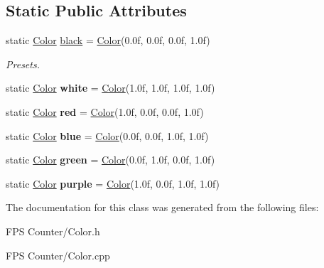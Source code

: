 \subsection*{Static Public Attributes}
\begin{DoxyCompactItemize}
\item 
\mbox{\label{class_color_a47086e1bb4d747932c264d53ab570417}} 
static \mbox{\hyperlink{class_color}{Color}} \mbox{\hyperlink{class_color_a47086e1bb4d747932c264d53ab570417}{black}} = \mbox{\hyperlink{class_color}{Color}}(0.\+0f, 0.\+0f, 0.\+0f, 1.\+0f)
\begin{DoxyCompactList}\small\item\em Presets. \end{DoxyCompactList}\item 
\mbox{\label{class_color_a7257e1adfe8a4a26b1029d5523700410}} 
static \mbox{\hyperlink{class_color}{Color}} {\bfseries white} = \mbox{\hyperlink{class_color}{Color}}(1.\+0f, 1.\+0f, 1.\+0f, 1.\+0f)
\item 
\mbox{\label{class_color_abe661abffec399c494c4d3ff4ae26f83}} 
static \mbox{\hyperlink{class_color}{Color}} {\bfseries red} = \mbox{\hyperlink{class_color}{Color}}(1.\+0f, 0.\+0f, 0.\+0f, 1.\+0f)
\item 
\mbox{\label{class_color_a32f958fee6c9ab0b2b6eca28ddb92b93}} 
static \mbox{\hyperlink{class_color}{Color}} {\bfseries blue} = \mbox{\hyperlink{class_color}{Color}}(0.\+0f, 0.\+0f, 1.\+0f, 1.\+0f)
\item 
\mbox{\label{class_color_a90dd40fe4beeda39a505c6be65346261}} 
static \mbox{\hyperlink{class_color}{Color}} {\bfseries green} = \mbox{\hyperlink{class_color}{Color}}(0.\+0f, 1.\+0f, 0.\+0f, 1.\+0f)
\item 
\mbox{\label{class_color_a0bd9d03204fdf09f5976c971111e6648}} 
static \mbox{\hyperlink{class_color}{Color}} {\bfseries purple} = \mbox{\hyperlink{class_color}{Color}}(1.\+0f, 0.\+0f, 1.\+0f, 1.\+0f)
\end{DoxyCompactItemize}


The documentation for this class was generated from the following files\+:\begin{DoxyCompactItemize}
\item 
F\+P\+S Counter/Color.\+h\item 
F\+P\+S Counter/Color.\+cpp\end{DoxyCompactItemize}
